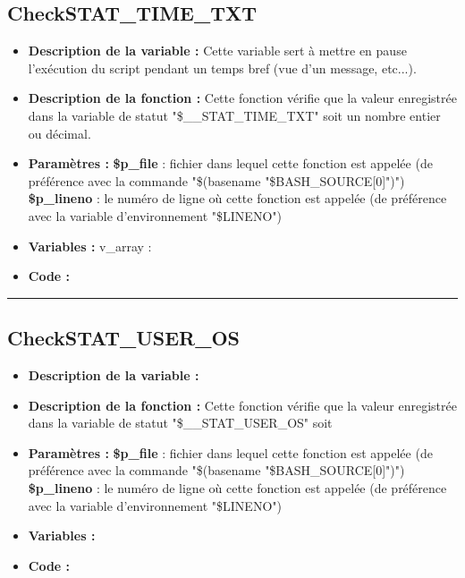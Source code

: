 \documentclass[a4paper,10pt]{article}
\begin{document}
\subsection{CheckSTAT\_TIME\_TXT}\color{white}
\begin{itemize}
    \item \textbf{Description de la variable :} Cette variable sert à mettre en pause l'exécution du script pendant un temps bref (vue d'un message, etc...).

    \item \textbf{Description de la fonction :} Cette fonction vérifie que la valeur enregistrée dans la variable de statut "\$\_\_STAT\_TIME\_TXT" soit un nombre entier ou décimal.

    \item \textbf{Paramètres :}
        \color{orange}\textbf{\$p\_file}\color{white} : fichier dans lequel cette fonction est appelée (de préférence avec la commande "\$(\color{gray}basename \color{white}"\color{orange}\$BASH\_SOURCE[0]\color{white}")")
    \color{orange}\textbf{\$p\_lineno}\color{white} : le numéro de ligne où cette fonction est appelée (de préférence avec la variable d'environnement "\color{orange}\$LINENO\color{white}")

    \item \textbf{Variables :} v\_array :

    \item \textbf{Code :}
\end{itemize}


\color{green}\par\noindent\rule{\textwidth}{0.4pt}\color{white}

\color{green}
\subsection{CheckSTAT\_USER\_OS}\color{white}
\begin{itemize}
    \item \textbf{Description de la variable :}

    \item \textbf{Description de la fonction :} Cette fonction vérifie que la valeur enregistrée dans la variable de statut "\$\_\_STAT\_USER\_OS" soit

    \item \textbf{Paramètres :}
        \color{orange}\textbf{\$p\_file}\color{white} : fichier dans lequel cette fonction est appelée (de préférence avec la commande "\$(\color{gray}basename \color{white}"\color{orange}\$BASH\_SOURCE[0]\color{white}")")
    \color{orange}\textbf{\$p\_lineno}\color{white} : le numéro de ligne où cette fonction est appelée (de préférence avec la variable d'environnement "\color{orange}\$LINENO\color{white}")

    \item \textbf{Variables :}

    \item \textbf{Code :}
\end{itemize}
\end{document}
